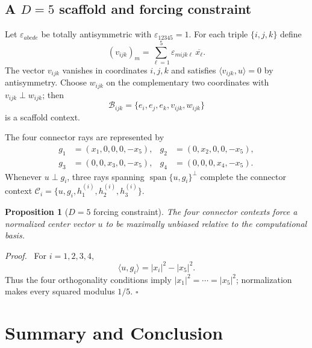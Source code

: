 \documentclass[%
  reprint,
  superscriptaddress,
  showpacs,
  showkeys,
  amsmath,amssymb,
  pra,
  longbibliography,
  floatfix,
  x11names
]{revtex4-2}
\newenvironment{revision}{\begingroup\color{revisionblue}}{\endgroup}
\newtheorem{proposition}{Proposition}
\newenvironment{proof}{\par\noindent\textit{Proof.}\ }{\hfill$\square$\par}
\begin{document}
\begin{revision}
\subsection{A $D=5$ scaffold and forcing constraint}

Let $\varepsilon_{abcde}$ be totally antisymmetric with $\varepsilon_{12345}=1$.  For each triple $\{i,j,k\}$ define
\[
(v_{ijk})_m=\sum_{\ell=1}^5\varepsilon_{mijk\ell}\,\overline{x_\ell}.
\]
The vector $v_{ijk}$ vanishes in coordinates $i,j,k$ and satisfies $\langle v_{ijk},u\rangle=0$ by antisymmetry.  Choose $w_{ijk}$ on the complementary two coordinates with $v_{ijk}\perp w_{ijk}$; then
\[
\mathcal{B}_{ijk}=\{e_i,e_j,e_k,v_{ijk},w_{ijk}\}
\]
is a scaffold context.

The four connector rays are represented by
\begin{align*}
g_1&=(x_1,0,0,0,-x_5),&
g_2&=(0,x_2,0,0,-x_5),\\
g_3&=(0,0,x_3,0,-x_5),&
g_4&=(0,0,0,x_4,-x_5).
\end{align*}
Whenever $u\perp g_i$, three rays spanning $\operatorname{span}\{u,g_i\}^{\perp}$ complete the connector context $\mathcal{C}_i=\{u,g_i,h^{(i)}_1,h^{(i)}_2,h^{(i)}_3\}$.

\begin{proposition}[$D=5$ forcing constraint]
\label{prop:D5forcing}
The four connector contexts force a normalized center vector $u$ to be maximally unbiased relative to the computational basis.
\end{proposition}

\begin{proof}
For $i=1,2,3,4$,
\[
\langle u,g_i\rangle=|x_i|^2-|x_5|^2.
\]
Thus the four orthogonality conditions imply $|x_1|^2=\cdots=|x_5|^2$; normalization makes every squared modulus $1/5$.
\end{proof}
\end{revision}

\section{Summary and Conclusion}

\end{document}
